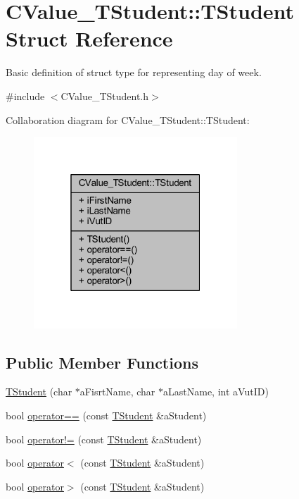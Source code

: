 \hypertarget{struct_c_value___t_student_1_1_t_student}{}\section{C\+Value\+\_\+\+T\+Student\+:\+:T\+Student Struct Reference}
\label{struct_c_value___t_student_1_1_t_student}


Basic definition of struct type for representing day of week.  




{\ttfamily \#include $<$C\+Value\+\_\+\+T\+Student.\+h$>$}



Collaboration diagram for C\+Value\+\_\+\+T\+Student\+:\+:T\+Student\+:
\nopagebreak
\begin{figure}[H]
\begin{center}
\leavevmode
\includegraphics[width=217pt]{struct_c_value___t_student_1_1_t_student__coll__graph}
\end{center}
\end{figure}
\subsection*{Public Member Functions}
\begin{DoxyCompactItemize}
\item 
\hyperlink{struct_c_value___t_student_1_1_t_student_ae052eac687165ae925ca2a15bccc9d95}{T\+Student} (char $\ast$a\+Fisrt\+Name, char $\ast$a\+Last\+Name, int a\+Vut\+ID)
\item 
bool \hyperlink{struct_c_value___t_student_1_1_t_student_ac12071cfbbb72f3666833d7da227f052}{operator==} (const \hyperlink{struct_c_value___t_student_1_1_t_student}{T\+Student} \&a\+Student)
\item 
bool \hyperlink{struct_c_value___t_student_1_1_t_student_aaadc7d5525e434de77c6874052174903}{operator!=} (const \hyperlink{struct_c_value___t_student_1_1_t_student}{T\+Student} \&a\+Student)
\item 
bool \hyperlink{struct_c_value___t_student_1_1_t_student_a0e70d174799ef62209bfd2719077f127}{operator$<$} (const \hyperlink{struct_c_value___t_student_1_1_t_student}{T\+Student} \&a\+Student)
\item 
bool \hyperlink{struct_c_value___t_student_1_1_t_student_ae31809572b52d475b4e891b2a4acaafd}{operator$>$} (const \hyperlink{struct_c_value___t_student_1_1_t_student}{T\+Student} \&a\+Student)
\end{DoxyCompactItemize}
